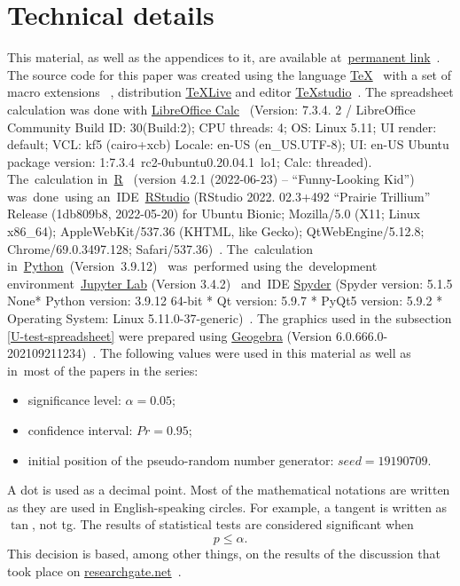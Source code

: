 \documentclass[]{scrreprt}
\begin{document}
\chapter{Technical details}
This material, as well as the appendices to it, are available at~\href{https://github.com/Kirill-Murashev/AI_for_valuers_book/tree/main/Parts-Chapters/Mann-Whitney-Wilcoxon}{permanent link}~\cite{Murashev:u-test}. The source code for this paper was created using the language \href{https://www.ctan.org/}{\TeX}~\cite{TeX:site} with a set of macro extensions \href{https://www latex-project.org/}{\LaTeXe}~\cite{LaTeX:site}, distribution \href{https://www.tug.org/texlive/}{TeXLive} \cite{TeXLive:site} and editor \href{https://www.texstudio.org/}{TeXstudio}~\cite{TeXstudio:site}. The spreadsheet calculation was done with \href{https://www.libreoffice.org/discover/calc/}{LibreOffice Calc}~\cite{LO:Calc} (Version: 7.3.4. 2 / LibreOffice Community Build ID: 30(Build:2); CPU threads: 4; OS: Linux 5.11; UI render: default; VCL: kf5 (cairo+xcb) Locale: en-US (en\_US.UTF-8); UI: en-US Ubuntu package version: 1:7.3.4~rc2-0ubuntu0.20.04.1~lo1; Calc: threaded). The~calculation in~\href{https://www.r-project.org/}{R}~\cite{R_language} (version 4.2.1 (2022-06-23) -- ``Funny-Looking Kid'') was~done~using an~IDE~\href{https://www.rstudio.com/}{RStudio} (RStudio 2022. 02.3+492 ``Prairie Trillium'' Release (1db809b8, 2022-05-20) for Ubuntu Bionic; Mozilla/5.0 (X11; Linux x86\_64); AppleWebKit/537.36 (KHTML, like Gecko); QtWebEngine/5.12.8; Chrome/69.0.3497.128; Safari/537.36)~\cite{RStudio:official_site}. The~calculation in~\href{https://www.python.org/}{Python}~(Version~3.9.12)~\cite{Python:site} was~performed using the~development environment~\href{https://jupyter.org}{Jupyter Lab} (Version 3.4.2)~\cite{Jupyter:site} and~IDE \href{https://www.spyder-ide.org/}{Spyder} (Spyder version: 5.1.5 None* Python version: 3.9.12 64-bit * Qt version: 5.9.7 * PyQt5 version: 5.9.2
* Operating System: Linux 5.11.0-37-generic)~\cite{Spyder:site}. The graphics used in the subsection \ref{U-test-spreadsheet} were prepared using \href{Geogebra:official-site}{Geogebra} (Version 6.0.666.0-202109211234)~\cite{Geogebra:official-site}. The following values were used in this material as well as in~most of the papers in the series:
\begin{itemize}
	\item significance level: $\alpha = 0.05$;
	\item confidence interval: $Pr = 0.95$;
	\item initial position of the pseudo-random number generator: $seed=19190709$.
\end{itemize}
A dot is used as a decimal point. Most of the mathematical notations are written as they are used in English-speaking circles. For example, a tangent is written as~$\tan$, not tg. The results of statistical tests are considered significant when
\begin{equation}\label{eq:significance}
p \leq \alpha.
\end{equation}
This decision is based, among other things, on the results of the discussion that took place on \href{researchgate.net}{researchgate.net}~\cite{RG:p-equals-alpha}.
%
\end{document}
